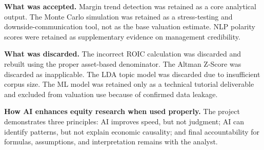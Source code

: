 \documentclass[11pt]{article}
\begin{document}
\textbf{What was accepted.} Margin trend detection was retained as a core analytical output. The Monte Carlo simulation was retained as a stress-testing and downside-communication tool, not as the base valuation estimate. NLP polarity scores were retained as supplementary evidence on management credibility.

\textbf{What was discarded.} The incorrect ROIC calculation was discarded and rebuilt using the proper asset-based denominator. The Altman Z-Score was discarded as inapplicable. The LDA topic model was discarded due to insufficient corpus size. The ML model was retained only as a technical tutorial deliverable and excluded from valuation use because of confirmed data leakage.

\textbf{How AI enhances equity research when used properly.} The project demonstrates three principles: AI improves speed, but not judgment; AI can identify patterns, but not explain economic causality; and final accountability for formulas, assumptions, and interpretation remains with the analyst.
\end{document}
